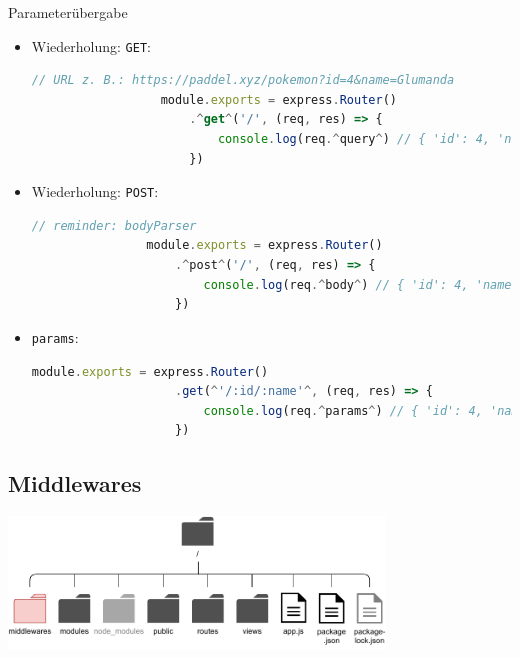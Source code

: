 \begin{bonus}{Parameterübergabe}
    \begin{itemize}
        \item Wiederholung: \texttt{GET}:

              \begin{lstlisting}[language=JavaScript]
                  // URL z. B.: https://paddel.xyz/pokemon?id=4&name=Glumanda
                  module.exports = express.Router()
                      .^get^('/', (req, res) => {
                          console.log(req.^query^) // { 'id': 4, 'name': 'Glumanda' }
                      })
              \end{lstlisting}
        \item Wiederholung: \texttt{POST}:

              \begin{lstlisting}[language=JavaScript]
                // reminder: bodyParser
                module.exports = express.Router()
                    .^post^('/', (req, res) => {
                        console.log(req.^body^) // { 'id': 4, 'name': 'Glumanda' }
                    })
            \end{lstlisting}
        \item \texttt{params}:

              \begin{lstlisting}[language=JavaScript]
                module.exports = express.Router()
                    .get(^'/:id/:name'^, (req, res) => {
                        console.log(req.^params^) // { 'id': 4, 'name': 'Glumanda' }
                    })
            \end{lstlisting}
    \end{itemize}
\end{bonus}

\subsection{Middlewares}

\begin{center}
    \includegraphics[width=0.75\textwidth]{includes/figures/bonus_nodejs_middlewares.pdf}
\end{center}

